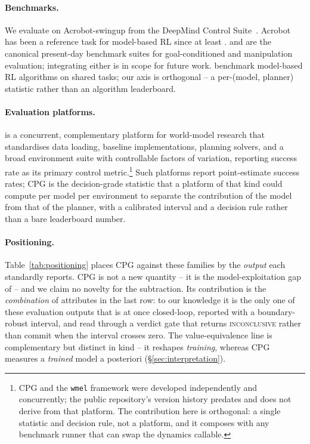 \documentclass[10pt,letterpaper]{article}
\begin{document}
\paragraph{Benchmarks.} We evaluate on Acrobot-swingup from the DeepMind Control Suite~\citep{tassa2018dmc,tunyasuvunakool2020dmcontrol}. Acrobot has been a reference task for model-based RL since at least \citet{schaefer2007acrobot}. \citet{park2024ogbench} and \citet{liu2023libero} are the canonical present-day benchmark suites for goal-conditioned and manipulation evaluation; integrating either is in scope for future work. \citet{wang2019benchmarking} benchmark model-based RL algorithms on shared tasks; our axis is orthogonal -- a per-(model, planner) statistic rather than an algorithm leaderboard.

\paragraph{Evaluation platforms.} \citet{maes2026swm} is a concurrent, complementary platform for world-model research that standardises data loading, baseline implementations, planning solvers, and a broad environment suite with controllable factors of variation, reporting success rate as its primary control metric.\footnote{CPG and the \texttt{wmel} framework were developed independently and concurrently; the public repository's version history predates and does not derive from that platform. The contribution here is orthogonal: a single statistic and decision rule, not a platform, and it composes with any benchmark runner that can swap the dynamics callable.} Such platforms report point-estimate success rates; CPG is the decision-grade statistic that a platform of that kind could compute per model per environment to separate the contribution of the model from that of the planner, with a calibrated interval and a decision rule rather than a bare leaderboard number.

\paragraph{Positioning.} Table~\ref{tab:positioning} places CPG against these families by the \emph{output} each standardly reports. CPG is not a new quantity -- it is the model-exploitation gap of \citet{yu2020mopo,kidambi2020morel} -- and we claim no novelty for the subtraction. Its contribution is the \emph{combination} of attributes in the last row: to our knowledge it is the only one of these evaluation outputs that is at once closed-loop, reported with a boundary-robust interval, and read through a verdict gate that returns \textsc{inconclusive} rather than commit when the interval crosses zero. The value-equivalence line is complementary but distinct in kind -- it reshapes \emph{training}, whereas CPG measures a \emph{trained} model a posteriori (\S\ref{sec:interpretation}).
\end{document}
